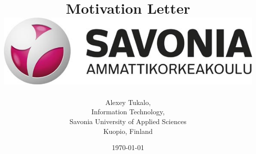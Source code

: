 \documentclass[english]{article}
\date{}
\begin{document}
\title{\vspace{2in}Motivation Letter\\
\vspace{0.5in}\includegraphics{savonia.jpg}}

\nopagebreak
\maketitle


\vspace{3in}

\author{
\begin{flushright}
Alexey Tukalo,\\
Information Technology,\\
Savonia University of Applied Sciences\\
Kuopio, Finland
\end{flushright}
}

\date{\today}
\thispagestyle{empty}
\end{document}
